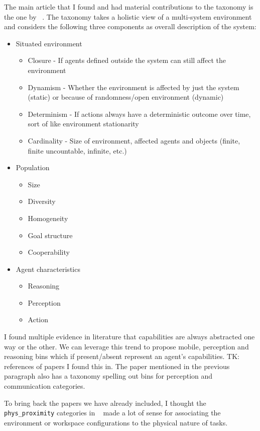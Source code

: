 \documentclass[letterpaper, 10 pt, conference]{ieeeconf}  %
\theoremstyle{definition}
\newcommand{\citet}[1]{\citeauthor{#1}~\cite{#1}}
\begin{document}
The main article that I found and had material contributions to the taxonomy is
the one by \citet{moya2007towards}. The taxonomy takes a holistic view of a
multi-system environment and considers the following three components as overall
description of the system:
\begin{itemize}{}
  \item Situated environment
    \begin{itemize}{}
        \item Closure - If agents defined outside the system can still affect
        the environment
        \item Dynamism - Whether the environment is affected by just the system
        (static) or because of randomness/open environment (dynamic)
        \item Determinism - If actions always have a deterministic outcome over
        time, sort of like environment stationarity
        \item Cardinality - Size of environment, affected agents and objects
        (finite, finite uncountable, infinite, etc.)
    \end{itemize}
    \item Population
    \begin{itemize}{}
      \item Size
      \item Diversity
      \item Homogeneity
      \item Goal structure
      \item Cooperability
    \end{itemize}
  \item Agent characteristics
    \begin{itemize}{}
      \item Reasoning
      \item Perception
      \item Action
    \end{itemize}
\end{itemize}

I found multiple evidence in literature that capabilities are
always abstracted one way or the other. We can leverage this trend to propose
mobile, perception and reasoning bins which if present/absent represent an
agent's capabilities. TK: references of papers I found this in. The paper
mentioned in the previous paragraph also has a taxonomy spelling out bins for
perception and communication categories.

To bring back the papers we have already included, I thought the \texttt{phys_proximity}
categories in \citet{yanco2004updated} made a lot of sense for associating the
environment or workspace configurations to the physical nature of tasks.
\end{document}

